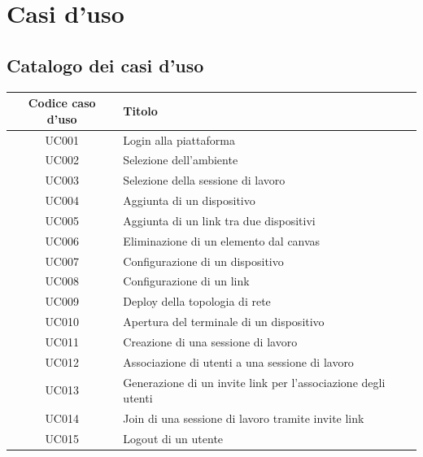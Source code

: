 \documentclass[../main.tex]{subfiles}
\begin{document}
\chapter{Casi d'uso}
\section{Catalogo dei casi d'uso}
\begin{tabularx}{150mm}{|c|X|}
    \hline
    \textbf{Codice caso d'uso}          & \textbf{Titolo} \\
    \hline
    UC001   &   Login alla piattaforma \\
    \hline
    UC002   &   Selezione dell'ambiente \\
    \hline
    UC003   &   Selezione della sessione di lavoro \\
    \hline
    UC004   &   Aggiunta di un dispositivo \\
    \hline
    UC005   &   Aggiunta di un link tra due dispositivi \\
    \hline
    UC006   &   Eliminazione di un elemento dal canvas \\
    \hline
    UC007   &   Configurazione di un dispositivo \\
    \hline
    UC008   &   Configurazione di un link \\
    \hline
    UC009   &   Deploy della topologia di rete \\ 
    \hline
    UC010   &   Apertura del terminale di un dispositivo \\
    \hline
    UC011   &   Creazione di una sessione di lavoro \\
    \hline
    UC012   &   Associazione di utenti a una sessione di lavoro \\
    \hline
    UC013   &   Generazione di un invite link per l'associazione degli utenti \\
    \hline
    UC014   &   Join di una sessione di lavoro tramite invite link \\
    \hline
    UC015   &   Logout di un utente \\
    \hline
\end{tabularx}
\newpage
\end{document}

